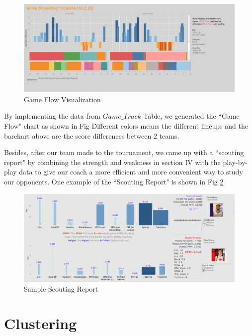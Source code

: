 \documentclass[conference]{IEEEtran}
\begin{document}
\begin{figure}[h!]
  \includegraphics[width=\linewidth]{gameflow.jpg}
  \caption{Game Flow Visualization}
  \vspace{-1mm}
  \label{fig:gameflow}
\end{figure}
By implementing the data from $Game\_Track$ Table, we generated the ``Game Flow" chart as shown in Fig \. Different colors means the different lineups and the barchart above are the score differences between 2 teams.

Besides, after our team made to the tournament, we came up with a ``scouting report" by combining the strength and weakness in section IV with the play-by-play data to give our coach a more efficient and more convenient way to study our opponents. One example of the ``Scouting Report" is shown in Fig \ref{fig:scouting}
\begin{figure}[h!]
  \includegraphics[width=\linewidth]{scouting.jpg}
  \caption{Sample Scouting Report}
  \vspace{-1mm}
  \label{fig:scouting}
\end{figure}

\section{Clustering}
\end{document}
